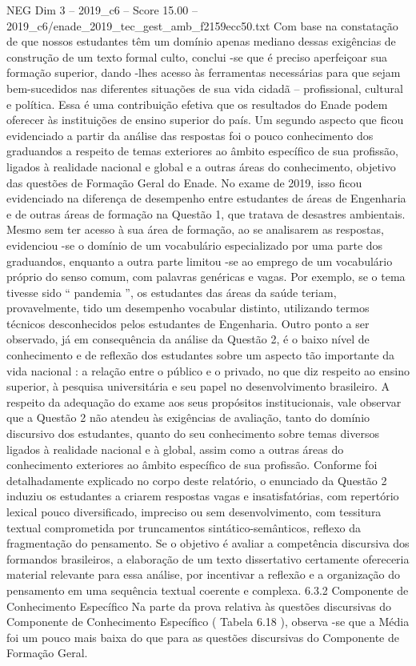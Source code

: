 \begin{textsample}{NEG Dim 3 – 2019\_c6 – Score 15.00 – 2019\_c6/enade\_2019\_tec\_gest\_amb\_f2159ecc50.txt}
Com base na constatação de que nossos estudantes têm um domínio apenas mediano dessas exigências de construção de um texto formal culto, conclui -se que é preciso aperfeiçoar sua formação superior, dando -lhes acesso às ferramentas necessárias para que sejam bem-sucedidos nas diferentes situações de sua vida cidadã – profissional, cultural e política.
Essa é uma contribuição efetiva que os resultados do Enade podem oferecer às instituições de ensino superior do país.
Um segundo aspecto que ficou evidenciado a partir da análise das respostas foi o pouco conhecimento dos graduandos a respeito de temas exteriores ao âmbito específico de sua profissão, ligados à realidade nacional e global e a outras áreas do conhecimento, objetivo das questões de Formação Geral do Enade.
No exame de 2019, isso ficou evidenciado na diferença de desempenho entre estudantes de áreas de Engenharia e de outras áreas de formação na Questão 1, que tratava de desastres ambientais.
Mesmo sem ter acesso à sua área de formação, ao se analisarem as respostas, evidenciou -se o domínio de um vocabulário especializado por uma parte dos graduandos, enquanto a outra parte limitou -se ao emprego de um vocabulário próprio do senso comum, com palavras genéricas e vagas.
Por exemplo, se o tema tivesse sido “ pandemia ”, os estudantes das áreas da saúde teriam, provavelmente, tido um desempenho vocabular distinto, utilizando termos técnicos desconhecidos pelos estudantes de Engenharia.
Outro ponto a ser observado, já em consequência da análise da Questão 2, é o baixo nível de conhecimento e de reflexão dos estudantes sobre um aspecto tão importante da vida nacional : a relação entre o público e o privado, no que diz respeito ao ensino superior, à pesquisa universitária e seu papel no desenvolvimento brasileiro.
A respeito da adequação do exame aos seus propósitos institucionais, vale observar que a Questão 2 não atendeu às exigências de avaliação, tanto do domínio discursivo dos estudantes, quanto do seu conhecimento sobre temas diversos ligados à realidade nacional e à global, assim como a outras áreas do conhecimento exteriores ao âmbito específico de sua profissão.
Conforme foi detalhadamente explicado no corpo deste relatório, o enunciado da Questão 2 induziu os estudantes a criarem respostas vagas e insatisfatórias, com repertório lexical pouco diversificado, impreciso ou sem desenvolvimento, com tessitura textual comprometida por truncamentos sintático-semânticos, reflexo da fragmentação do pensamento.
Se o objetivo é avaliar a competência discursiva dos formandos brasileiros, a elaboração de um texto dissertativo certamente ofereceria material relevante para essa análise, por incentivar a reflexão e a organização do pensamento em uma sequência textual coerente e complexa. 6.3.2 Componente de Conhecimento Específico Na parte da prova relativa às questões discursivas do Componente de Conhecimento Específico ( Tabela 6.18 ), observa -se que a Média foi um pouco mais baixa do que para as questões discursivas do Componente de Formação Geral.

\end{textsample}
